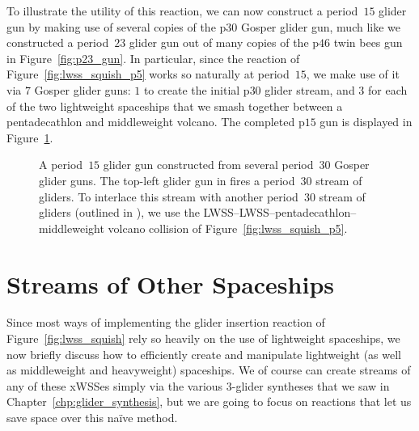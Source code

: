 To illustrate the utility of this reaction, we can now construct a period~$15$ glider gun by making use of several copies of the p$30$ Gosper glider gun, much like we constructed a period~$23$ glider gun out of many copies of the p$46$ twin bees gun in Figure~\ref{fig:p23_gun}. In particular, since the reaction of Figure~\ref{fig:lwss_squish_p5} works so naturally at period~$15$, we make use of it via $7$ Gosper glider guns: $1$ to create the initial p$30$ glider stream, and $3$ for each of the two lightweight spaceships that we smash together between a pentadecathlon and middleweight volcano. The completed p$15$ gun is displayed in Figure~\ref{fig:p15_gun}.

\begin{figure}[!htb]
	\centering
	\caption{A period~$15$ glider gun constructed from several period~$30$ Gosper glider guns. The top-left glider gun in  fires a period~$30$ stream of gliders. To interlace this stream with another period~$30$ stream of gliders (outlined in ), we use the LWSS--LWSS--pentadecathlon--middleweight volcano collision of Figure~\ref{fig:lwss_squish_p5}.}\label{fig:p15_gun}
\end{figure}



\section{Streams of Other Spaceships}

Since most ways of implementing the glider insertion reaction of Figure~\ref{fig:lwss_squish} rely so heavily on the use of lightweight spaceships, we now briefly discuss how to efficiently create and manipulate lightweight (as well as middleweight and heavyweight) spaceships. We of course can create streams of any of these xWSSes simply via the various $3$-glider syntheses that we saw in Chapter~\ref{chp:glider_synthesis}, but we are going to focus on reactions that let us save space over this na\"ive method.

